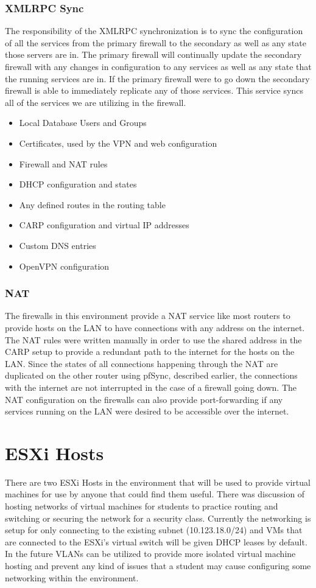 \documentclass[12pt]{IEEEtran}
\begin{document}
\subsubsection{XMLRPC Sync}
The responsibility of the XMLRPC synchronization is to sync the configuration of all the services from the primary firewall to the secondary as well as any state those servers are in.
The primary firewall will continually update the secondary firewall with any changes in configuration to any services as well as any state that the running services are in.
If the primary firewall were to go down the secondary firewall is able to immediately replicate any of those services. 
This service syncs all of the services we are utilizing in the firewall. 
\begin{itemize}
\item Local Database Users and Groups
\item Certificates, used by the VPN and web configuration
\item Firewall and NAT rules
\item DHCP configuration and states
\item Any defined routes in the routing table
\item CARP configuration and virtual IP addresses
\item Custom DNS entries
\item OpenVPN configuration
\end{itemize}

\subsubsection{NAT}
The firewalls in this environment provide a NAT service like most routers to provide hosts on the LAN to have connections with any address on the internet. 
The NAT rules were written manually in order to use the shared address in the CARP setup to provide a redundant path to the internet for the hosts on the LAN.
Since the states of all connections happening through the NAT are duplicated on the other router using pfSync, described earlier, the connections with the internet are not interrupted in the case of a firewall going down. 
The NAT configuration on the firewalls can also provide port-forwarding if any services running on the LAN were desired to be accessible over the internet.  

\section{ESXi Hosts}
There are two ESXi Hosts in the environment that will be used to provide virtual machines for use by anyone that could find them useful. 
There was discussion of hosting networks of virtual machines for students to practice routing and switching or securing the network for a security class. 
Currently the networking is setup for only connecting to the existing subnet (10.123.18.0/24) and VMs that are connected to the ESXi's virtual switch will be given DHCP leases by default. 
In the future VLANs can be utilized to provide more isolated virtual machine hosting and prevent any kind of issues that a student may cause configuring some networking within the environment.
\end{document}

